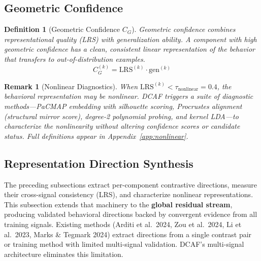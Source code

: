 \documentclass[11pt]{article}
\newtheorem{definition}{Definition}[section]
\newtheorem{remark}{Remark}[section]
\begin{document}
\subsection{Geometric Confidence}
\label{sec:geometric-confidence}

\begin{definition}[Geometric Confidence $C_G$]
\label{def:geometric-confidence}
Geometric confidence combines representational quality (LRS) with generalization ability. A component with high geometric confidence has a clean, consistent linear representation of the behavior that transfers to out-of-distribution examples.
\begin{equation}
C^{(k)}_G = \text{LRS}^{(k)} \cdot \text{gen}^{(k)}
\end{equation}
\end{definition}

\begin{remark}[Nonlinear Diagnostics]
\label{rem:nonlinear-diagnostics}
When $\text{LRS}^{(k)} < \tau_{\text{nonlinear}} = 0.4$, the behavioral representation may be nonlinear. DCAF triggers a suite of diagnostic methods---PaCMAP embedding with silhouette scoring, Procrustes alignment (structural mirror score), degree-2 polynomial probing, and kernel LDA---to characterize the nonlinearity without altering confidence scores or candidate status. Full definitions appear in Appendix~\ref{app:nonlinear}.
\end{remark}


\subsection{Representation Direction Synthesis}
\label{sec:representation-direction-synthesis}

The preceding subsections extract per-component contrastive directions, measure their cross-signal consistency (LRS), and characterize nonlinear representations. This subsection extends that machinery to the \textbf{global residual stream}, producing validated behavioral directions backed by convergent evidence from all training signals. Existing methods (Arditi et al.\ 2024, Zou et al.\ 2024, Li et al.\ 2023, Marks \& Tegmark 2024) extract directions from a single contrast pair or training method with limited multi-signal validation. DCAF's multi-signal architecture eliminates this limitation.
\end{document}
